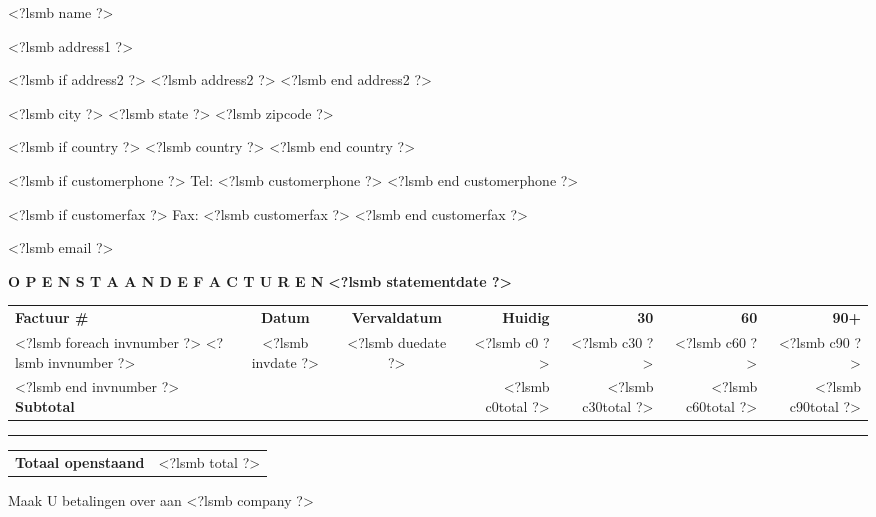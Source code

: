 \documentclass[twoside]{scrartcl}
\begin{document}
\newlength{\descrwidth}\setlength{\descrwidth}{10cm}

\newsavebox{\hdr}

\selectfont


\pagestyle{myheadings}

\fontsize{10pt}{12pt}\selectfont

\vspace*{1.5cm}

\parbox[t]{1cm}{\hfill}
\parbox[t]{10.5cm}{
  
<?lsmb name ?>

<?lsmb address1 ?>

<?lsmb if address2 ?>
<?lsmb address2 ?>
<?lsmb end address2 ?>

<?lsmb city ?> <?lsmb state ?> <?lsmb zipcode ?>

<?lsmb if country ?>
<?lsmb country ?>
<?lsmb end country ?>

}
\parbox[t]{7.5cm}{
<?lsmb if customerphone ?>
Tel: <?lsmb customerphone ?>
<?lsmb end customerphone ?>

<?lsmb if customerfax ?>
Fax: <?lsmb customerfax ?>
<?lsmb end customerfax ?>

<?lsmb email ?>
}
\hfill

\vspace{1cm}

\textbf{O P E N S T A A N D E   F A C T U R E N} \hfill \textbf{<?lsmb statementdate ?>}

\vspace{2cm}

\begin{tabular*}{\textwidth}{@{}l@{\extracolsep\fill}ccrrrr@{}}
  \textbf{Factuur \#} & \textbf{Datum} & \textbf{Vervaldatum} &
  \textbf{Huidig} & \textbf{30} & \textbf{60} & \textbf{90+} \\
<?lsmb foreach invnumber ?>
  <?lsmb invnumber ?> & <?lsmb invdate ?> & <?lsmb duedate ?> &
  <?lsmb c0 ?> & <?lsmb c30 ?> & <?lsmb c60 ?> & <?lsmb c90 ?> \\
<?lsmb end invnumber ?>
\textbf{Subtotal} & & & <?lsmb c0total ?> & <?lsmb c30total ?> & <?lsmb c60total ?> & <?lsmb c90total ?>
\end{tabular*}
\rule{\textwidth}{1pt}

\vspace{0.5cm}

\hfill
\begin{tabularx}{7cm}{Xr@{}}
  \textbf{Totaal openstaand} & <?lsmb total ?>
\end{tabularx}

\vfill

Maak U betalingen over aan <?lsmb company ?>
\end{document}
